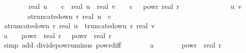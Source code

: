 \begin{isabellebody}
\ \ \ \ \ \ \ \ real\ u\ {\isasymle}\ {}\ {\isacharasterisk}{\kern0pt}\ c\ {\isasymand}\ {\isasymbar}real\ u\ {\isacharminus}{\kern0pt}\ real\ v{\isasymbar}\ {\isasymle}\ {}\ {\isacharasterisk}{\kern0pt}\ c\ {\isacharasterisk}{\kern0pt}\ {}\ powr\ {\isacharparenleft}{\kern0pt}{\isacharminus}{\kern0pt}real\ r{\isacharparenright}{\kern0pt}{\isachardoublequoteclose}\isanewline
\ \ \ \ \isamarkupfalse%
\ {\isacharminus}{\kern0pt}\isanewline
\ \ \ \ \ \ \isamarkupfalse%
\ u\ v\isanewline
\ \ \ \ \ \ \isamarkupfalse%
\ a{\isacharunderscore}{\kern0pt}{}{\isacharcolon}{\kern0pt}{\isachardoublequoteopen}truncate{\isacharunderscore}{\kern0pt}down\ r\ {\isacharparenleft}{\kern0pt}real\ u{\isacharparenright}{\kern0pt}\ {\isasymle}\ c{\isachardoublequoteclose}\isanewline
\ \ \ \ \ \ \isamarkupfalse%
\ a{\isacharunderscore}{\kern0pt}{}{\isacharcolon}{\kern0pt}{\isachardoublequoteopen}truncate{\isacharunderscore}{\kern0pt}down\ r\ {\isacharparenleft}{\kern0pt}real\ u{\isacharparenright}{\kern0pt}\ {\isacharequal}{\kern0pt}\ truncate{\isacharunderscore}{\kern0pt}down\ r\ {\isacharparenleft}{\kern0pt}real\ v{\isacharparenright}{\kern0pt}{\isachardoublequoteclose}\isanewline
\ \ \ \ \ \ \isamarkupfalse%
\ a{\isacharunderscore}{\kern0pt}{}{\isacharcolon}{\kern0pt}\ {\isachardoublequoteopen}{}\ {\isacharasterisk}{\kern0pt}\ {}\ powr\ {\isacharparenleft}{\kern0pt}{\isacharminus}{\kern0pt}\ real\ r{\isacharparenright}{\kern0pt}\ {\isacharequal}{\kern0pt}\ {}\ powr\ {\isacharparenleft}{\kern0pt}{}\ {\isacharminus}{\kern0pt}real\ r{\isacharparenright}{\kern0pt}{\isachardoublequoteclose}\isanewline
\ \ \ \ \ \ \ \ \isamarkupfalse%
\ {\isacharparenleft}{\kern0pt}simp\ add{\isacharcolon}{\kern0pt}\ divide{\isacharunderscore}{\kern0pt}powr{\isacharunderscore}{\kern0pt}uminus\ powr{\isacharunderscore}{\kern0pt}diff{\isacharparenright}{\kern0pt}\isanewline
\isanewline
\ \ \ \ \ \ \isamarkupfalse%
\ a{\isacharunderscore}{\kern0pt}{}{\isacharunderscore}{\kern0pt}{}{\isacharcolon}{\kern0pt}\ {\isachardoublequoteopen}{}\ {\isasymle}\ {}\ {\isacharasterisk}{\kern0pt}\ {\isacharparenleft}{\kern0pt}{}\ {\isacharminus}{\kern0pt}\ {}\ powr\ {\isacharparenleft}{\kern0pt}{\isacharminus}{\kern0pt}\ real\ r{\isacharparenright}{\kern0pt}{\isacharparenright}{\kern0pt}{\isachardoublequoteclose}\isanewline

\end{isabellebody}
